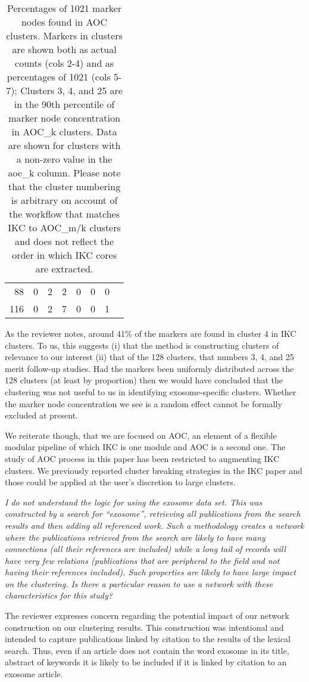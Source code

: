 \documentclass[11pt, oneside]{article}   	%
\begin{document}
\begin{table}[ht]
\begin{tabular}{rrrrrrrr}
88 & 0 &   2 &   2 &   0 &   0 &   0 \\ 
116 & 0 &  2 &   7 &   0 &   0 &   1 \\ 
   \hline
\end{tabular}
\caption{Percentages of 1021 marker nodes found in AOC clusters. Markers in clusters are shown both as actual counts (cols 2-4) and as percentages of 1021 (cols 5-7); Clusters 3, 4, and 25 are in the 90th percentile of marker node concentration in AOC\_k clusters. Data are shown for clusters with a non-zero value in the aoc\_k column. Please note that the cluster numbering is arbitrary on account of the workflow that matches IKC to AOC\_m/k clusters and does not reflect the order in which IKC cores are extracted. }
\end{table}

As the reviewer notes, around 41\% of the markers are found in cluster 4 in IKC clusters. To us, this suggests (i) that the method is constructing clusters of relevance to our interest
(ii) that of the 128 clusters, that numbers 3, 4, and 25 merit follow-up studies. Had the markers been uniformly distributed across the 128 clusters (at least by proportion) then we
would have concluded that the clustering was not useful to us in identifying exosome-specific clusters. Whether the marker node concentration we see is a random effect cannot be formally excluded at present.

We reiterate though, that we are focused on AOC, an element of a flexible modular pipeline of which IKC is one module and AOC is a second one. The study of AOC process in this paper has been restricted 
to augmenting IKC clusters. We previously reported cluster breaking strategies in the IKC paper and those could be applied at the user's discretion to large clusters.

\emph{I do not understand the logic for using the exosome data set. This was constructed by a search for “exosome”, retrieving all publications from the search results and then adding all referenced work. Such a methodology creates a network where the publications retrieved from the search are likely to have many connections (all their references are included) while a long tail of records will have very few relations (publications that are peripheral to the field and not having their references included). Such properties are likely to have large impact on the clustering. Is there a particular reason to use a network with these characteristics for this study?}

The reviewer expresses concern regarding the potential impact of our network construction on our clustering results.  This construction was intentional and intended to capture publications linked by citation to the results of the lexical search. Thus, even if an article does not contain the word exosome in its title, abstract of keywords it is likely to be included if it is linked by citation to an exosome article. 
\end{document}
